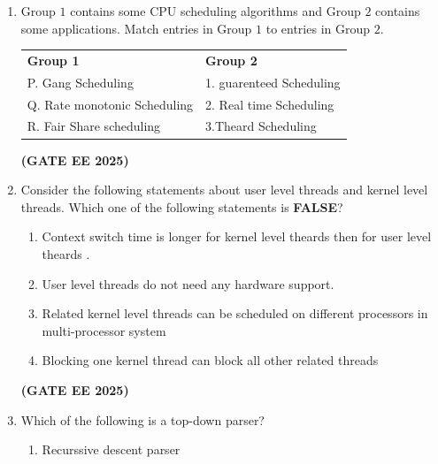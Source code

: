 \documentclass[journal,12pt,onecolumn]{IEEEtran}
\theoremstyle{remark}
\begin{document}
\begin {center}
\begin{enumerate}
\begin{enumerate}
\end{enumerate}
\hfill \textbf{(GATE EE 2025)}
    \item    Group $1$ contains some CPU scheduling algorithms and Group $2$ contains some applications. Match entries in Group $1$ to entries in Group $2$.
   
    
    
    \begin{tabular}{p{}p{}}


       \textbf{Group 1} &  \textbf{Group  2} \\ 
    P. Gang Scheduling &  1.  guarenteed Scheduling\\
   
    Q. Rate monotonic Scheduling &  2.  Real time Scheduling \\
     R.  Fair Share scheduling  &  3.Theard Scheduling \\
    \end{tabular}
\begin{enumerate}
\end{enumerate}
    \hfill \textbf{(GATE EE 2025)}
\item   Consider the following statements about user level threads and kernel level threads. Which one of the following statements is \textbf{FALSE}?
\begin{enumerate}
    \item  Context switch time  is longer for kernel level theards then for user level theards .
    \item User level threads do not need any hardware support.
    \item Related kernel level threads can be scheduled  on different processors in multi-processor  system 
    \item Blocking one kernel thread can block all other related threads
  \end{enumerate} 
 \hfill \textbf{(GATE EE 2025)}
  \item Which of the following is a top-down parser?
  \begin{enumerate}
      \item  Recurssive descent parser 

\end{enumerate}
\end{enumerate}
\end{center}
\end{document}
